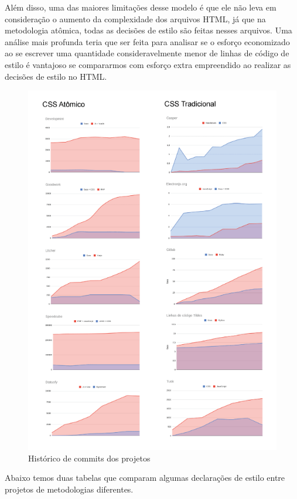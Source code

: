 Além disso, uma das maiores limitações desse modelo é que ele não leva em consideração o aumento da complexidade dos arquivos HTML, já que na metodologia atômica, todas as decisões de estilo são feitas nesses arquivos. Uma análise mais profunda teria que ser feita para analisar se o esforço economizado ao se escrever uma quantidade consideravelmente menor de linhas de código de estilo é vantajoso se compararmos com esforço extra empreendido ao realizar as decisões de estilo no HTML.

\begin{figure}[H]
\centering
\includegraphics{figuras/juntoss.png}
\caption{Histórico de commits dos projetos}
\end{figure}

Abaixo temos duas tabelas que comparam algumas declarações de estilo entre projetos de metodologias diferentes.

